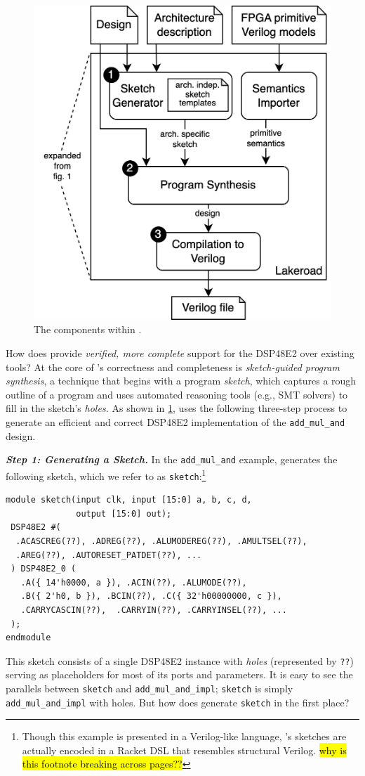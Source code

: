 \begin{figure}
    \centering
    \hspace{-1cm}%
    \includegraphics[width=.5\columnwidth]{lakeroad/assets/lakeroad-diagram.drawio.png}
   \caption{The components within \lr.}
    \label{fig:lakeroad-diagram}
\end{figure}

How does \lr provide 
  \textit{verified, more complete} support
  for the DSP48E2 over existing tools?  
At the core of \lr's
  correctness and completeness
  is
  \textit{sketch-guided program synthesis},
  a technique that  
  begins with a program \textit{sketch}, which
  captures a rough
  outline of a program
  and uses
  automated reasoning tools
  (e.g., SMT solvers)
  to fill in the sketch's \textit{holes.}
As shown in \cref{fig:lakeroad-diagram}, 
  \lr uses the following three-step process  
  to generate an efficient and correct
  DSP48E2 implementation
  of
  the \texttt{add\_mul\_and}
  design.

\textit{\textbf{Step 1: Generating a Sketch.}}
In
  the \texttt{add\_mul\_and}
  example,
  \lr
  generates
  the following sketch,
  which we refer to as \texttt{sketch}:\footnote{
Though this example is presented in a Verilog-like language,
  \lr's sketches are actually encoded in a Racket DSL that resembles structural Verilog.
  \hl{why is this footnote breaking across pages??}}
\begin{verbatim}
module sketch(input clk, input [15:0] a, b, c, d,
              output [15:0] out);
 DSP48E2 #(
  .ACASCREG(??), .ADREG(??), .ALUMODEREG(??), .AMULTSEL(??), 
  .AREG(??), .AUTORESET_PATDET(??), ...
 ) DSP48E2_0 (
   .A({ 14'h0000, a }), .ACIN(??), .ALUMODE(??), 
   .B({ 2'h0, b }), .BCIN(??), .C({ 32'h00000000, c }),
   .CARRYCASCIN(??),  .CARRYIN(??), .CARRYINSEL(??), ...
 );
endmodule
\end{verbatim}
This sketch consists of a single DSP48E2 instance
  with \textit{holes} 
  (represented by \texttt{??}) 
  serving as placeholders for most of its ports and parameters.
It is easy to see  
  the parallels
  between \texttt{sketch}
  and
  \texttt{add\_mul\_and\_impl};
  \texttt{sketch}
  is simply 
  \texttt{add\_mul\_and\_impl}
  with holes.
But how does \lr generate \texttt{sketch}
  in the first place?

